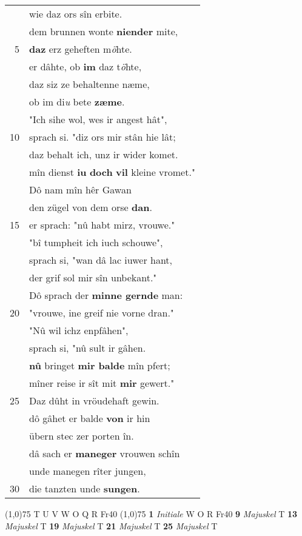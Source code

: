 \documentclass[8pt,a4paper,notitlepage]{article}
\begin{document}
\begin{table}[ht]
\begin{minipage}[t]{0.5\linewidth}
\begin{tabular}{rl}
 & wie daz ors sîn erbite.\\ 
 & dem brunnen wonte \textbf{niender} mite,\\ 
5 & \textbf{daz} erz geheften m\textit{ö}hte.\\ 
 & er dâhte, ob \textbf{im} daz t\textit{ö}hte,\\ 
 & daz siz ze behaltenne næme,\\ 
 & ob im di\textit{u} bete \textbf{zæme}.\\ 
 & "Ich sihe wol, wes ir angest hât",\\ 
10 & sprach si. "diz ors mir stân hie lât;\\ 
 & daz behalt ich, unz ir wider komet.\\ 
 & mîn dienst \textbf{iu} \textbf{doch} \textbf{vil} kleine vromet."\\ 
 & Dô nam mîn hêr Gawan\\ 
 & den zügel von dem orse \textbf{dan}.\\ 
15 & er sprach: "nû habt mirz, vrouwe."\\ 
 & "bî tumpheit ich iuch schouwe",\\ 
 & sprach si, "wan dâ lac iuwer hant,\\ 
 & der grif sol mir sîn unbekant."\\ 
 & Dô sprach der \textbf{minne gernde} man:\\ 
20 & "vrouwe, ine greif nie vorne dran."\\ 
 & "Nû wil ichz enpfâhen",\\ 
 & sprach si, "nû sult ir gâhen.\\ 
 & \textbf{nû} bringet \textbf{mir balde} mîn pfert;\\ 
 & mîner reise ir sît mit \textbf{mir} gewert."\\ 
25 & Daz dûht in vröudehaft gewin.\\ 
 & dô gâhet er balde \textbf{von} ir hin\\ 
 & übern stec zer porten în.\\ 
 & dâ sach er \textbf{maneger} vrouwen schîn\\ 
 & unde manegen rîter jungen,\\ 
30 & die tanzten unde \textbf{sungen}.\\ 
\end{tabular}
\scriptsize
\line(1,0){75} \newline
T U V W O Q R Fr40 \newline
\line(1,0){75} \newline
\textbf{1} \textit{Initiale} W O R Fr40  \textbf{9} \textit{Majuskel} T  \textbf{13} \textit{Majuskel} T  \textbf{19} \textit{Majuskel} T  \textbf{21} \textit{Majuskel} T  \textbf{25} \textit{Majuskel} T  \newline

\end{minipage}
\end{table}
\end{document}

